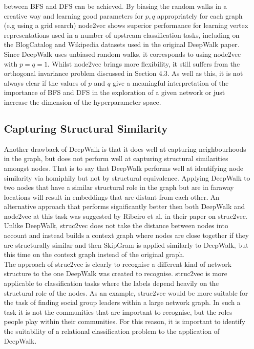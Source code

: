 \documentclass[a4paper]{article}
\begin{document}
between BFS and DFS can be achieved. By biasing the random walks in a creative
way and learning good parameters for $p,q$ appropriately for each graph (e.g
using a grid search) node2vec shows superior performance for learning vertex
representations used in a number of upstream classification tasks, including on
the BlogCatalog and Wikipedia datasets used in the original DeepWalk paper.\\
Since DeepWalk uses unbiased random walks, it corresponds to using node2vec with $p=q=1$. Whilst node2vec brings
more flexibility, it still suffers from the orthogonal invariance problem discussed in Section 4.3. As well as this, it is not always clear if the values of $p$ and $q$ give a
meaningful interpretation of the importance of BFS and DFS in the exploration of a given network or just increase the dimension of the hyperparameter space.
\subsection{Capturing Structural Similarity}
Another drawback of DeepWalk is that it does well at capturing neighbourhoods in the graph, but does not perform well
at capturing structural similarities amongst nodes. That is to say that DeepWalk
performs well at identifying node similarity via homiphily but not by structural equivalence. Applying DeepWalk to two nodes
that have a similar structural role in the graph but are in faraway locations
will result in embeddings that are distant from each other. An alternative
approach that performs significantly better then both DeepWalk and node2vec at this task was suggested by
Ribeiro et al. in their paper on struc2vec\cite{ribeiro2017}. Unlike DeepWalk, struc2vec does not
take the distance between nodes into account and instead builds a context graph
where nodes are close together if they are structurally similar and then
SkipGram is applied similarly to DeepWalk, but this time on the
context graph instead of the original graph.\\
The approach of struc2vec is clearly to recognise a different kind of network
structure to the one DeepWalk was created to recognise. struc2vec is more
applicable to classification tasks where the labels depend heavily on the
structural role of the nodes. As an example, struc2vec would be more suitable
for the task of finding social group leaders within a large network
graph. In such a task it is not the communities that are important to recognise,
but the roles people play within their communities. For this reason, it is
important to identify the suitability of a relational classification problem to
the application of DeepWalk.
\end{document}
